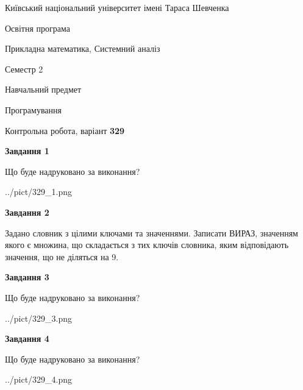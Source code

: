 \documentclass[12pt, ukrainian]{article}
\begin{document}
{{\begin {small}\par
{ \center  Київський національний університет імені Тараса Шевченка \par}
{\parbox {5 cm}{Освітня програма \hfill}{\parbox {8 cm}{Прикладна математика, Системний аналіз \hfill}}\parbox {5 cm}{\hfill Семестр 2}}\par
{\parbox {5 cm} {Навчальний предмет \hfill}\parbox {7 cm}{Програмування \hfill}\parbox {6cm}{\hfill}\par}\vspace{-7pt} \end{small}}{\center Контрольна робота, варіант  \No \textbf
{ 329 }\par}}
{
\begin {large}
{\begin {center}\textbf{Завдання 1}\end {center}}\par
Що буде надруковано за виконання?\par\par
\begin{center}
	{../pict/329_1.png}
\end{center}
\newpage

{\begin {center}\textbf{Завдання 2}\end {center}}\par
Задано словник  з цілими ключами та значеннями. Записати ВИРАЗ, значенням якого є множина, що складається  з тих ключів словника, яким відповідають значення, що не діляться на 9.\par
\newpage

{\begin {center}\textbf{Завдання 3}\end {center}}\par
Що буде надруковано за виконання?
\begin{center}
	{../pict/329_3.png}
\end{center}
\newpage

{\begin {center}\textbf{Завдання 4}\end {center}}\par
Що буде надруковано за виконання?\par
\begin{center}
	{../pict/329_4.png}
\end{center}
\newpage


\end{large}}
\end{document}
